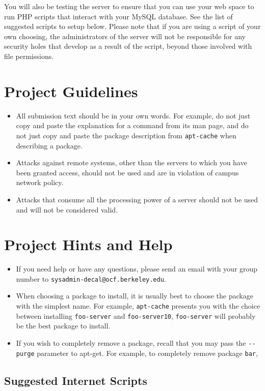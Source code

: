 \documentclass[10pt]{article}
\begin{document}
You will also be testing the server to ensure that you can use your
web space to run PHP scripts that interact with your MySQL database.
See the list of suggested scripts to setup below. Please note
that if you are using a script of your own choosing, the administrators
of the server will not be responsible for any security holes that
develop as a result of the script, beyond those involved with file
permissions. 


\section{Project Guidelines}

\begin{itemize}
\item All submission text should be in your own words. For example, do not
just copy and paste the explanation for a command from its man page,
and do not just copy and paste the package description from \texttt{apt-cache}
when describing a package. 
\item Attacks against remote systems, other than the servers to which you
have been granted access, should not be used and are in violation
of campus network policy.
\item Attacks that consume all the processing power of a server should not
be used and will not be considered valid.
\end{itemize}

\section{Project Hints and Help}

\begin{itemize}
\item If you need help or have any questions, please send an email with
your group number to \texttt{sysadmin-decal@ocf.berkeley.edu}.
\item When choosing a package to install, it is usually best to choose the
package with the simplest name. For example, \texttt{apt-cache} presents
you with the choice between installing \texttt{foo-server} and \texttt{foo-server10},
\texttt{foo-server} will probably be the best package to install.
\item If you wish to completely remove a package, recall that you may pass
the \texttt{-{}-purge} parameter to apt-get. For example, to completely
remove package \texttt{bar},
\end{itemize}
\subsection{Suggested Internet Scripts}
\end{document}
